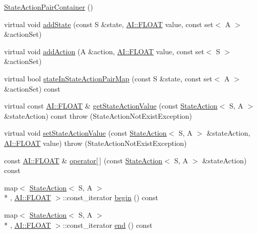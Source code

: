 \begin{DoxyCompactItemize}
\item 
\hyperlink{classAI_1_1StateActionPairContainer_a6b6a773f9ef9e474f879dea4de5d109b}{State\-Action\-Pair\-Container} ()
\item 
virtual void \hyperlink{classAI_1_1StateActionPairContainer_a12842518174d0af5fc89c7a86e766099}{add\-State} (const S \&state, \hyperlink{namespaceAI_a41b74884a20833db653dded3918e05c3}{A\-I\-::\-F\-L\-O\-A\-T} value, const set$<$ A $>$ \&action\-Set)
\item 
virtual void \hyperlink{classAI_1_1StateActionPairContainer_af4c9faef1c7d4e35b11f95b8a84352ae}{add\-Action} (A \&action, \hyperlink{namespaceAI_a41b74884a20833db653dded3918e05c3}{A\-I\-::\-F\-L\-O\-A\-T} value, const set$<$ S $>$ \&action\-Set)
\item 
virtual bool \hyperlink{classAI_1_1StateActionPairContainer_a4da559c1dafe0c368a331c47aede0490}{state\-In\-State\-Action\-Pair\-Map} (const S \&state, const set$<$ A $>$ \&action\-Set) const 
\item 
virtual const \hyperlink{namespaceAI_a41b74884a20833db653dded3918e05c3}{A\-I\-::\-F\-L\-O\-A\-T} \& \hyperlink{classAI_1_1StateActionPairContainer_aa3dccc9c82a2ec4130050c832e3da6c9}{get\-State\-Action\-Value} (const \hyperlink{classAI_1_1StateAction}{State\-Action}$<$ S, A $>$ \&state\-Action) const   throw (\-State\-Action\-Not\-Exist\-Exception)
\item 
virtual void \hyperlink{classAI_1_1StateActionPairContainer_a26fa5b9fd043865695e6c4adf97188d5}{set\-State\-Action\-Value} (const \hyperlink{classAI_1_1StateAction}{State\-Action}$<$ S, A $>$ \&state\-Action, \hyperlink{namespaceAI_a41b74884a20833db653dded3918e05c3}{A\-I\-::\-F\-L\-O\-A\-T} value)  throw (\-State\-Action\-Not\-Exist\-Exception)
\item 
const \hyperlink{namespaceAI_a41b74884a20833db653dded3918e05c3}{A\-I\-::\-F\-L\-O\-A\-T} \& \hyperlink{classAI_1_1StateActionPairContainer_a4dc529e9a2fa432e93fe4e4d083fce6e}{operator\mbox{[}$\,$\mbox{]}} (const \hyperlink{classAI_1_1StateAction}{State\-Action}$<$ S, A $>$ \&state\-Action) const 
\item 
map$<$ \hyperlink{classAI_1_1StateAction}{State\-Action}$<$ S, A $>$\\*
, \hyperlink{namespaceAI_a41b74884a20833db653dded3918e05c3}{A\-I\-::\-F\-L\-O\-A\-T} $>$\-::const\-\_\-iterator \hyperlink{classAI_1_1StateActionPairContainer_abb152cc2644ba6fad1da5476b746dd30}{begin} () const 
\item 
map$<$ \hyperlink{classAI_1_1StateAction}{State\-Action}$<$ S, A $>$\\*
, \hyperlink{namespaceAI_a41b74884a20833db653dded3918e05c3}{A\-I\-::\-F\-L\-O\-A\-T} $>$\-::const\-\_\-iterator \hyperlink{classAI_1_1StateActionPairContainer_a36cb0d1278cd67b4a7b4967ef6740937}{end} () const 
\end{DoxyCompactItemize}
